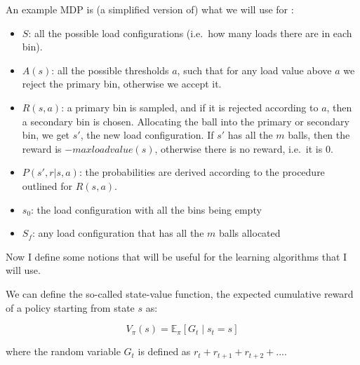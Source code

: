 An example MDP is (a simplified version of) what we will use for \TwoThinning:

\begin{itemize}[itemsep=0pt]
    \item 
    $S$: all the possible load configurations (i.e.\ how many loads there are in each bin).
    \item
    $A(s)$: all the possible thresholds $a$, such that for any load value above $a$ we reject the primary bin, otherwise we accept it.
    \item
    $R(s, a)$: a primary bin is sampled, and if it is rejected according to $a$, then a secondary bin is chosen. Allocating the ball into the primary or secondary bin, we get $s'$, the new load configuration. If $s'$ has all the $m$ balls, then the reward is $-maxloadvalue(s)$, otherwise there is no reward, i.e.\ it is $0$.
    \item
    $P(s', r | s, a)$: the probabilities are derived according to the procedure outlined for $R(s,a)$.
    \item
    $s_0$: the load configuration with all the bins being empty
    \item
    $S_f$: any load configuration that has all the $m$ balls allocated
\end{itemize}


Now I define some notions that will be useful for the learning algorithms that I will use.


We can define the so-called state-value function, the expected cumulative reward of a policy starting from state $s$ as:

\begin{equation}\label{eq:statevalueFunction}
V_{\pi}(s)=\mathbb{E}_\pi[G_t \mid s_t = s]
\end{equation}

where the random variable $G_t$ is defined as $r_{t} +  r_{t+1} + r_{t+2} + ...$.

